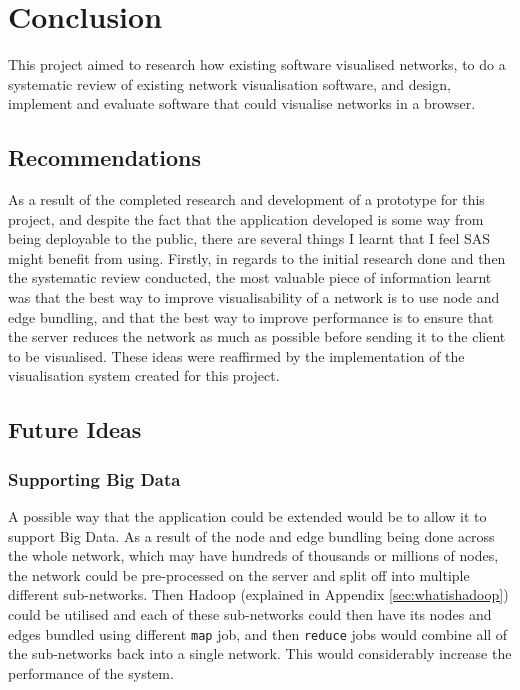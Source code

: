 \documentclass[../dissertation.tex]{subfiles}
\begin{document}
\chapter{Conclusion}

This project aimed to research how existing software visualised networks, to do a systematic review of existing network visualisation software, and design, implement and evaluate software that could visualise networks in a browser. 

\section{Recommendations}

As a result of the completed research and development of a prototype for this project, and despite the fact that the application developed is some way from being deployable to the public, there are several things I learnt that I feel SAS might benefit from using. Firstly, in regards to the initial research done and then the systematic review conducted, the most valuable piece of information learnt was that the best way to improve visualisability of a network is to use node and edge bundling, and that the best way to improve performance is to ensure that the server reduces the network as much as possible before sending it to the client to be visualised. These ideas were reaffirmed by the implementation of the visualisation system created for this project.

\section{Future Ideas}
\label{sec:further_ideas}

\subsection{Supporting Big Data}

A possible way that the application could be extended would be to allow it to support Big Data. As a result of the node and edge bundling being done across the whole network, which may have hundreds of thousands or millions of nodes, the network could be pre-processed on the server and split off into multiple different sub-networks. Then Hadoop \cite{hadoop} (explained in Appendix \ref{sec:whatishadoop}) could be utilised and each of these sub-networks could then have its nodes and edges bundled using different \texttt{map} job, and then \texttt{reduce} jobs would combine all of the sub-networks back into a single network. This would considerably increase the performance of the system.
\end{document}
